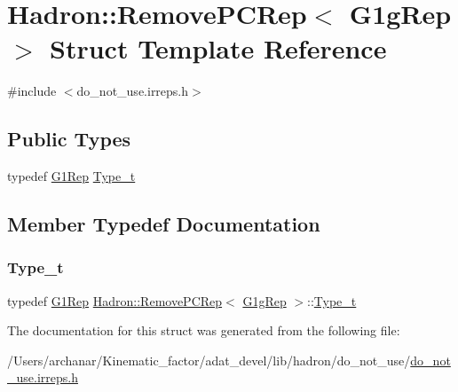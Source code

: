 \hypertarget{structHadron_1_1RemovePCRep_3_01G1gRep_01_4}{}\section{Hadron\+:\+:Remove\+P\+C\+Rep$<$ G1g\+Rep $>$ Struct Template Reference}
\label{structHadron_1_1RemovePCRep_3_01G1gRep_01_4}


{\ttfamily \#include $<$do\+\_\+not\+\_\+use.\+irreps.\+h$>$}

\subsection*{Public Types}
\begin{DoxyCompactItemize}
\item 
typedef \mbox{\hyperlink{structHadron_1_1G1Rep}{G1\+Rep}} \mbox{\hyperlink{structHadron_1_1RemovePCRep_3_01G1gRep_01_4_abf2b92413572b161f78c06e6bfd31f11}{Type\+\_\+t}}
\end{DoxyCompactItemize}


\subsection{Member Typedef Documentation}
\mbox{\label{structHadron_1_1RemovePCRep_3_01G1gRep_01_4_abf2b92413572b161f78c06e6bfd31f11}} 
\subsubsection{\texorpdfstring{Type\_t}{Type\_t}}
{\footnotesize\ttfamily typedef \mbox{\hyperlink{structHadron_1_1G1Rep}{G1\+Rep}} \mbox{\hyperlink{structHadron_1_1RemovePCRep}{Hadron\+::\+Remove\+P\+C\+Rep}}$<$ \mbox{\hyperlink{structHadron_1_1G1gRep}{G1g\+Rep}} $>$\+::\mbox{\hyperlink{structHadron_1_1RemovePCRep_3_01G1gRep_01_4_abf2b92413572b161f78c06e6bfd31f11}{Type\+\_\+t}}}



The documentation for this struct was generated from the following file\+:\begin{DoxyCompactItemize}
\item 
/\+Users/archanar/\+Kinematic\+\_\+factor/adat\+\_\+devel/lib/hadron/do\+\_\+not\+\_\+use/\mbox{\hyperlink{do__not__use_8irreps_8h}{do\+\_\+not\+\_\+use.\+irreps.\+h}}\end{DoxyCompactItemize}
